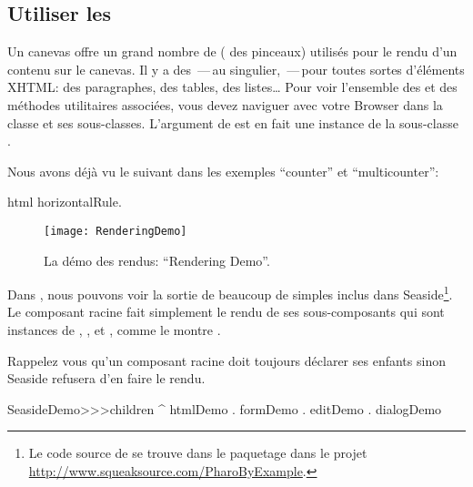 \documentclass[a4paper,10pt,twoside]{book}
\begin{document}
\subsection{Utiliser les \brushes}
\seeindex{\brushes}{\brush}
Un canevas offre un grand nombre de \brushes (\ie{}
des pinceaux) utilisés pour le rendu d'un contenu sur le canevas.
Il y a des \brushes\,---\,au singulier, \brush\,---\,pour toutes
sortes d'éléments XHTML: des paragraphes, des tables, des listes\ldots
Pour voir l'ensemble des \brushes et des méthodes utilitaires
associées, vous devez naviguer avec votre Browser dans la classe
 et ses sous-classes. 
L'argument de  est en fait une instance de la
sous-classe .

Nous avons déjà vu le \brush suivant dans les exemples ``counter'' et ``multicounter'':
\begin{code}{}
html horizontalRule.
\end{code}

\begin{figure}[ht]
\begin{center}
\texttt{[image: RenderingDemo]}
\caption{La démo des rendus: ``Rendering Demo''.}
\end{center}
\end{figure}

Dans , nous pouvons voir la sortie de beaucoup
de \brushes simples inclus dans Seaside\footnote{Le code source de
   se trouve dans le paquetage 
  dans le projet
  \url{http://www.squeaksource.com/PharoByExample}.
  }.
Le composant racine  fait simplement le rendu
de ses sous-composants qui sont instances de
, , 
et , comme le montre .

\needspace{7ex}

\noindent
Rappelez vous qu'un composant racine doit toujours déclarer ses
enfants sinon Seaside refusera d'en faire le rendu.
\begin{code}{}
SeasideDemo>>>children
	^ { htmlDemo . formDemo . editDemo . dialogDemo }
\end{code}
\end{document}

